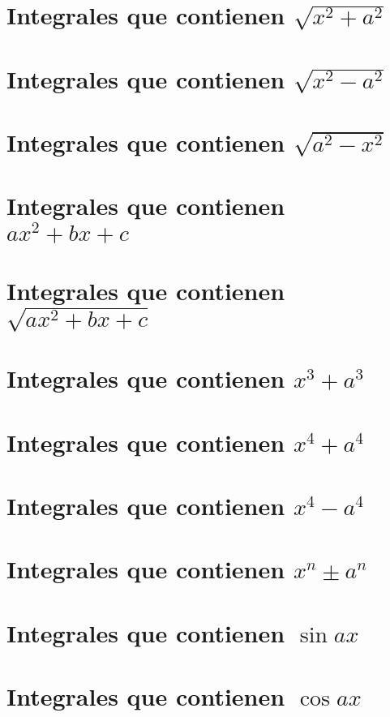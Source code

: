 \section{Integrales que contienen $\sqrt{x^2 + a^2}$}

\section{Integrales que contienen $\sqrt{x^2 - a^2}$}

\section{Integrales que contienen $\sqrt{a^2 - x^2}$}

\section{Integrales que contienen $ax^2 + bx + c$}

\section{Integrales que contienen $\sqrt{ax^2 + bx + c}$}

\section{Integrales que contienen $x^3 + a^3$}

\section{Integrales que contienen $x^4 + a^4$}

\section{Integrales que contienen $x^4 - a^4$}

\section{Integrales que contienen $x^n \pm a^n$}

\section{Integrales que contienen $\sin ax$}

\section{Integrales que contienen $\cos ax$}

